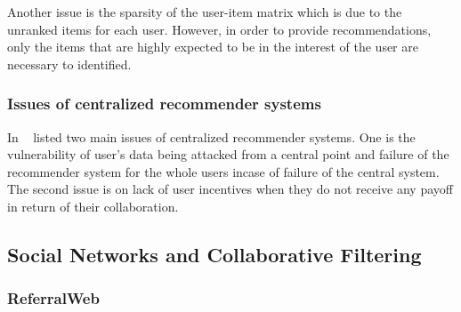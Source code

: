 \documentclass [12pt]{article} \usepackage{multicol}
\begin{document}
\begin{enumerate}
Another issue is the sparsity of the user-item matrix which is due to the unranked items
for each user. However, in order to provide recommendations, only the items that are highly expected
to be in the interest of the user are necessary to identified.


\end{enumerate}


\subsubsection {Issues of centralized recommender systems}

	In ~\cite{vidal2005protocol} listed two main issues of
centralized recommender systems. One is the vulnerability of user's
data being attacked from a central point and failure of the
recommender system for the whole users incase of failure of the
central system. The second issue is on lack of user incentives when
they do not receive any payoff in return of their collaboration.
\paragraph{}


%
	


\subsection{Social Networks and Collaborative Filtering}

\subsubsection{ReferralWeb}
\end{document}
